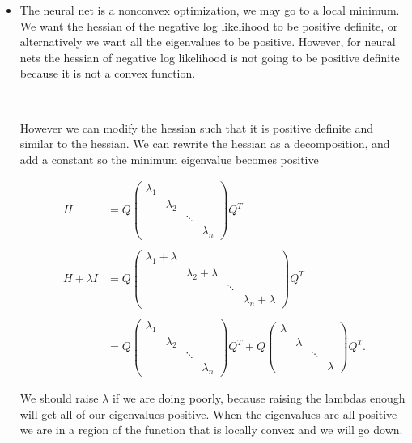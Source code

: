 \documentclass[]{article}
\begin{document}
\begin{itemize} \item[ ] 
 The neural net is a nonconvex optimization, we may go to a local minimum. We want the hessian of the negative log likelihood to be positive definite, or alternatively we want all the eigenvalues to be positive. However, for neural nets the hessian of negative log likelihood is not going to be positive definite because it is not a convex function. 
 
 \ 
 
 However we can modify the hessian such that it is positive definite and similar to the hessian. We can rewrite the hessian as a decomposition, and add a constant so the minimum eigenvalue becomes positive
 
 \begin{align*}
     H&= Q \begin{pmatrix}
     \lambda_1  & &  \\
     & \lambda_2 &  \\
     & & \ddots &  \\
       &  &  &\lambda_n
     \end{pmatrix} Q^T \\
     \\
     H + \lambda I &= Q \begin{pmatrix}
     \lambda_1 + \lambda  & &  \\
     & \lambda_2 + \lambda&  \\
     & & \ddots &  \\
       &  &  &\lambda_n +  \lambda
     \end{pmatrix} Q^T \\
     \\
     &= Q \begin{pmatrix}
     \lambda_1  & &  \\
     & \lambda_2 &  \\
     & & \ddots &  \\
       &  &  &\lambda_n
     \end{pmatrix} Q^T+
     Q \begin{pmatrix}
     \lambda  & &  \\
     & \lambda &  \\
     & & \ddots &  \\
       &  &  &\lambda
     \end{pmatrix} Q^T.
 \end{align*}
 
We should raise $\lambda$ if we are doing poorly, because raising the lambdas enough will get all of our eigenvalues positive. When the eigenvalues are all positive we are in a region of the function that is locally convex and we will go down.
\end{itemize}
\end{document}
